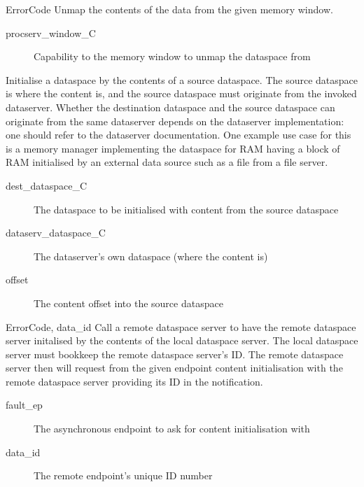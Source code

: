 \begin{description}
    \item {}
        {ErrorCode}
    Unmap the contents of the data from the given memory window.
    \begin{description}
        \item [procserv\_window\_C] Capability to the memory window to unmap the dataspace from
    \end{description}

    \item {}
    Initialise a dataspace by the contents of a source dataspace. The source dataspace is where the content is, and the source dataspace must originate from the invoked dataserver. Whether the destination dataspace and the source dataspace can originate from the same dataserver depends on the dataserver implementation: one should refer to the dataserver documentation. One example use case for this is a memory manager implementing the dataspace for RAM having a block of RAM initialised by an external data source such as a file from a file server.
    \begin{description}
        \item [dest\_dataspace\_C] The dataspace to be initialised with content from the source dataspace
        \item [dataserv\_dataspace\_C] The dataserver's own dataspace (where the content is)
        \item [offset] The content offset into the source dataspace
    \end{description}

    \item {}
        {ErrorCode, data\_id}
    Call a remote dataspace server to have the remote dataspace server initalised by the contents of the local dataspace server. The local dataspace server must bookkeep the remote dataspace server's ID. The remote dataspace server then will request from the given endpoint content initialisation with the remote dataspace server providing its ID in the notification.
    \begin{description}
        \item [fault\_ep] The asynchronous endpoint to ask for content initialisation with
        \item [data\_id] The remote endpoint's unique ID number
    \end{description}


\end{description}
